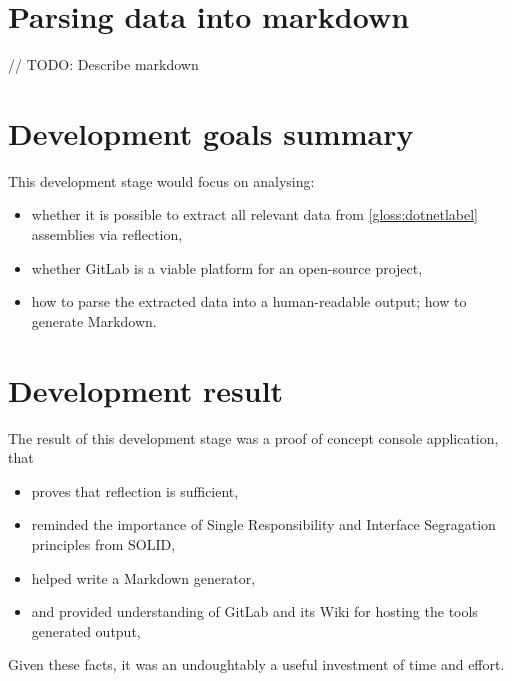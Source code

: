 \section{Parsing data into markdown}
// TODO: Describe markdown

\section{Development goals summary}
This development stage would focus on analysing:
\begin{itemize}
    \item whether it is possible to extract all relevant data from \ref{gloss:dotnetlabel} assemblies via reflection,
    \item whether GitLab is a viable platform for an open-source project,
    \item how to parse the extracted data into a human-readable output; how to generate Markdown.
\end{itemize}

\section{Development result}

The result of this development stage was a proof of concept console application, that
\begin{itemize}
    \item proves that reflection is sufficient,
    \item reminded the importance of Single Responsibility and Interface Segragation principles from SOLID,
    \item helped write a Markdown generator,
    \item and provided understanding of GitLab and its Wiki for hosting the tools generated output,
\end{itemize}

Given these facts, it was an undoughtably a useful investment of time and effort.